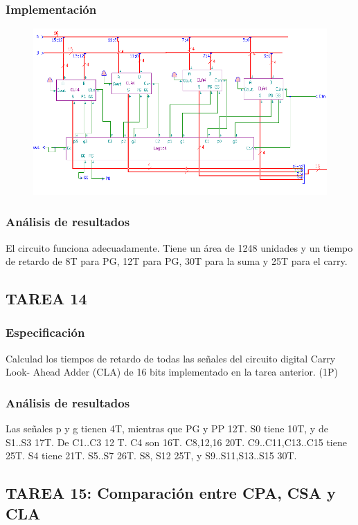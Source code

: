 \documentclass{article}
\begin{document}
		\subsubsection*{Implementación}
		 \begin{figure}[ht]
			\includegraphics[width=0.8\linewidth]{CLA16}
		 	\centering
		 \end{figure}

		\subsubsection*{Análisis de resultados}
				El circuito funciona adecuadamente. Tiene un área de 1248 unidades y un tiempo de retardo de 8T para PG, 12T para PG, 30T para la suma y 25T para el carry.


	\subsection{TAREA 14}
		\subsubsection*{Especificación}
		Calculad los tiempos de retardo de todas las señales del circuito digital Carry Look-
		Ahead Adder (CLA) de 16 bits implementado en la tarea anterior. (1P)

		\subsubsection*{Análisis de resultados}
		Las señales p y g tienen 4T, mientras que PG y PP 12T. S0 tiene 10T, y de S1..S3 17T. De C1..C3 12 T. C4 son 16T. C8,12,16 20T. C9..C11,C13..C15 tiene 25T. S4 tiene 21T. S5..S7 26T. S8, S12 25T, y S9..S11,S13..S15 30T.

	\subsection{TAREA 15: Comparación entre CPA, CSA y CLA}
\end{document}
